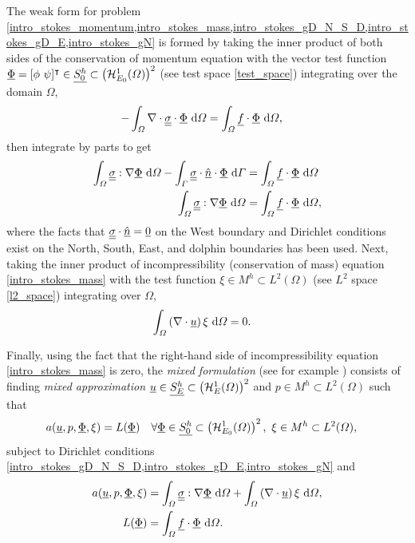 The weak form for problem \cref{intro_stokes_momentum,intro_stokes_mass,intro_stokes_gD_N_S_D,intro_stokes_gD_E,intro_stokes_gN} is formed by taking the inner product of both sides of the conservation of momentum equation with the vector test function $\underline{\Phi} = [\phi\ \psi ]^\intercal \in \underline{S_0^h} \subset \left( \mathcal{H}_{E_0}^1(\varOmega) \right)^2$ (see test space \cref{test_space}) integrating over the domain $\Omega$,
\begin{align*}
  -\int_{\varOmega} \nabla \cdot \underline{\underline{\sigma}} \cdot \underline{\Phi} \ \mathrm{d}\varOmega &= \int_{\varOmega} \underline{f} \cdot \underline{\Phi} \ \mathrm{d}\varOmega,
\end{align*}
then integrate by parts to get 
\begin{align*}
  \int_{\varOmega} \underline{\underline{\sigma}} : \nabla \underline{\Phi} \ \mathrm{d}\varOmega - \int_{\varGamma} \underline{\underline{\sigma}} \cdot \underline{\hat{n}} \cdot \underline{\Phi} \ \mathrm{d}\varGamma &= \int_{\varOmega} \underline{f} \cdot \underline{\Phi} \ \mathrm{d}\varOmega \\
  \int_{\varOmega} \underline{\underline{\sigma}} : \nabla \underline{\Phi} \ \mathrm{d}\varOmega &= \int_{\varOmega} \underline{f} \cdot \underline{\Phi} \ \mathrm{d}\varOmega,
\end{align*}
where the facts that $\underline{\underline{\sigma}} \cdot \underline{\hat{n}} = \underline{0}$ on the West boundary and Dirichlet conditions exist on the North, South, East, and dolphin boundaries has been used.  Next, taking the inner product of incompressibility (conservation of mass) equation \cref{intro_stokes_mass} with the test function $\xi \in M^h \subset L^2(\Omega)$ (see $L^2$ space \cref{l2_space}) integrating over $\Omega$,
\begin{align*}
  \int_{\varOmega} \left( \nabla \cdot \underline{u} \right) \xi \ \mathrm{d}\varOmega &= 0.
\end{align*}

Finally, using the fact that the right-hand side of incompressibility equation \cref{intro_stokes_mass} is zero, the  \emph{mixed formulation} (see for example \citet{johnson_2009}) consists of finding \emph{mixed approximation} $\underline{u} \in \underline{S_E^h} \subset \left( \mathcal{H}_E^1(\varOmega) \right)^2$ and $p \in M^h \subset L^2(\Omega)$ such that
{\scriptsize
\begin{align}
  \label{intro_stokes_mixed_problem}
  a(\underline{u},p,\underline{\Phi},\xi) &= L(\underline{\Phi}) && \forall \underline{\Phi} \in \underline{S_0^h} \subset \left( \mathcal{H}_{E_0}^1(\varOmega) \right)^2,\ \xi \in M^h \subset L^2(\varOmega),
\end{align}}
subject to Dirichlet conditions \cref{intro_stokes_gD_N_S_D,intro_stokes_gD_E,intro_stokes_gN} and
\begin{align*}
  a(\underline{u},p,\underline{\Phi},\xi) &= \int_{\varOmega} \underline{\underline{\sigma}} : \nabla \underline{\Phi} \ \mathrm{d}\varOmega + \int_{\varOmega} \left( \nabla \cdot \underline{u} \right) \xi \ \mathrm{d}\varOmega, \\
  L(\underline{\Phi}) &= \int_{\varOmega} \underline{f} \cdot \underline{\Phi} \ \mathrm{d}\varOmega.
\end{align*}

